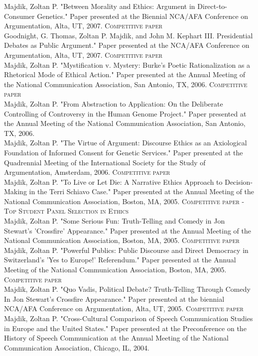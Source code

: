 \documentclass[10pt, a4paper]{article}
\newcommand{\years}[1]{\marginnote{\scriptsize #1}}
\begin{document}
\years{2007}Majdik, Zoltan P. "Between Morality and Ethics: Argument in
Direct-to-Consumer Genetics." Paper presented at the Biennial NCA/AFA
Conference on Argumentation, Alta, UT, 2007. \textsc{Competitive paper}\\
\years{2007}Goodnight, G. Thomas, Zoltan P. Majdik, and John M. Kephart III. Presidential Debates as Public Argument." Paper presented at the NCA/AFA
Conference on Argumentation, Alta, UT, 2007. \textsc{Competitive paper}\\
\years{2006}Majdik, Zoltan P. "Mystification v. Mystery: Burke's Poetic
Rationalization as a Rhetorical Mode of Ethical Action." Paper presented at the
Annual Meeting of the National Communication Association, San Antonio, TX, 2006.
\textsc{Competitive paper}\\
\years{2006}Majdik, Zoltan P. "From Abstraction to Application: On the
Deliberate Controlling of Controversy in the Human Genome Project." Paper
presented at the Annual Meeting of the National Communication Association, San
Antonio, TX, 2006.\\
\years{2006}Majdik, Zoltan P. "The Virtue of Argument: Discourse Ethics
as an Axiological Foundation of Informed Consent for Genetic Services." Paper
presented at the Quadrennial Meeting of the International Society for the Study
of Argumentation, Amsterdam, 2006. \textsc{Competitive paper}\\
\years{2005}Majdik, Zoltan P. "To Live or Let Die: A Narrative Ethics
Approach to Decision-Making in the Terri Schiavo Case." Paper presented at the
Annual Meeting of the National Communication Association, Boston, MA, 2005.
\textsc{Competitive paper - Top Student Panel Selection in Ethics}\\
\years{2005}Majdik, Zoltan P. "Some Serious Fun: Truth-Telling and Comedy
in Jon Stewart's 'Crossfire' Appearance." Paper presented at the Annual Meeting of
the National Communication Association, Boston, MA, 2005. \textsc{Competitive paper}\\
\years{2005}Majdik, Zoltan P. "Powerful Publics: Public Discourse and
Direct Democracy in Switzerland's 'Yes to Europe!' Referendum." Paper presented
at the Annual Meeting of the National Communication Association, Boston, MA,
2005. \textsc{Competitive paper}\\
\years{2005}Majdik, Zoltan P. "Quo Vadis, Political Debate? Truth-Telling
Through Comedy In Jon Stewart’s Crossfire Appearance." Paper presented at the
biennial NCA/AFA Conference on Argumentation, Alta, UT, 2005. \textsc{Competitive
paper}\\
\years{2004}Majdik, Zoltan P. "Cross-Cultural Comparison of Speech
Communication Studies in Europe and the United States." Paper presented at the
Preconference on the History of Speech Communication at the Annual Meeting of
the National Communication Association, Chicago, IL, 2004.
\end{document}
